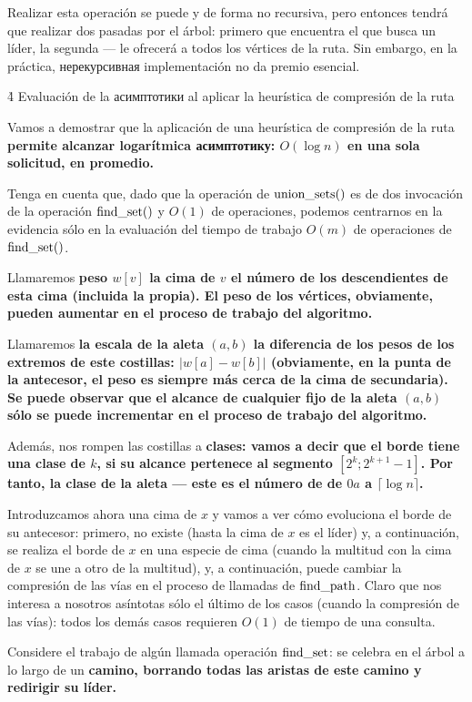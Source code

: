 Realizar esta operación se puede y de forma no recursiva, pero entonces tendrá que realizar dos pasadas por el árbol: primero que encuentra el que busca un líder, la segunda --- le ofrecerá a todos los vértices de la ruta. Sin embargo, en la práctica, нерекурсивная implementación no da premio esencial.


\h4{ Evaluación de la асимптотики al aplicar la heurística de compresión de la ruta }

Vamos a demostrar que la aplicación de una heurística de compresión de la ruta \bf{permite alcanzar logarítmica асимптотику}: $O(\log n)$ en una sola solicitud, en promedio.

Tenga en cuenta que, dado que la operación de ${\rm union\_sets}()$ es de dos invocación de la operación ${\rm find\_set}()$ y $O(1)$ de operaciones, podemos centrarnos en la evidencia sólo en la evaluación del tiempo de trabajo $O(m)$ de operaciones de ${\rm find\_set}()$.

Llamaremos \bf{peso} $w[v]$ la cima de $v$ el número de los descendientes de esta cima (incluida la propia). El peso de los vértices, obviamente, pueden aumentar en el proceso de trabajo del algoritmo.

Llamaremos \bf{la escala de la aleta} $(a,b)$ la diferencia de los pesos de los extremos de este costillas: $|w[a] - w[b]|$ (obviamente, en la punta de la antecesor, el peso es siempre más cerca de la cima de secundaria). Se puede observar que el alcance de cualquier fijo de la aleta $(a,b)$ sólo se puede incrementar en el proceso de trabajo del algoritmo.

Además, nos rompen las costillas a \bf{clases}: vamos a decir que el borde tiene una clase de $k$, si su alcance pertenece al segmento $[2^k; 2^{k+1}-1]$. Por tanto, la clase de la aleta --- este es el número de de $0 a$ a $\lceil \log n \rceil$.

Introduzcamos ahora una cima de $x$ y vamos a ver cómo evoluciona el borde de su antecesor: primero, no existe (hasta la cima de $x$ es el líder) y, a continuación, se realiza el borde de $x$ en una especie de cima (cuando la multitud con la cima de $x$ se une a otro de la multitud), y, a continuación, puede cambiar la compresión de las vías en el proceso de llamadas de ${\rm find\_path}$. Claro que nos interesa a nosotros asíntotas sólo el último de los casos (cuando la compresión de las vías): todos los demás casos requieren $O(1)$ de tiempo de una consulta.

Considere el trabajo de algún llamada operación ${\rm find\_set}$: se celebra en el árbol a lo largo de un \bf{camino}, borrando todas las aristas de este camino y redirigir su líder.

